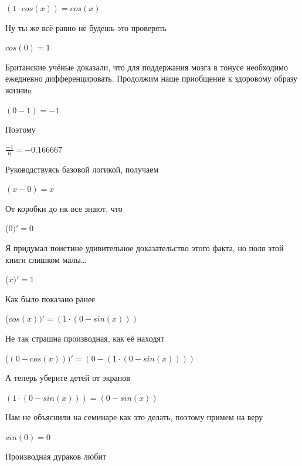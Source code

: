 \documentclass[12pt,a4paper,fleqn]{article}
\begin{document}
\begin{center}
\begin{center}
\begin{center}
\begin{center}
\begin{center}
\begin{center}
\begin{center}
$(1 \cdot cos(x)) = cos(x)$\end{center}
Ну ты же всё равно не будешь это проверять

\begin{center}
\begin{center}$cos(0) = 1$\end{center}
Британские учёные доказали, что для поддержания мозга в тонусе необходимо ежедневно дифференцировать. Продолжим наше приобщение к здоровому образу жизниn

\begin{center}
\begin{center}$(0-1) = -1$\end{center}
Поэтому

\begin{center}
\begin{center}$\frac{-1}{6} = -0.166667$\end{center}
Руководствуясь базовой логикой, получаем

\begin{center}
$(x-0) = x$\end{center}
От коробки до нк все знают, что

\begin{center}
 ($0)'
  = 0$\end{center}
Я придумал поистине удивительное доказательство этого факта, но поля этой книги слишком малы\ldots

\begin{center}
 ($x)'
  = 1$\end{center}
Как было показано ранее

\begin{center}
 ($cos(x))'
  = (1 \cdot (0-sin(x)))$\end{center}
Не так страшна производная, как её находят\cite{link2}

\begin{center}
 ($(0-cos(x)))'
  = (0-(1 \cdot (0-sin(x))))$\end{center}
А теперь уберите детей от экранов

\begin{center}
$(1 \cdot (0-sin(x))) = (0-sin(x))$\end{center}
Нам не объяснили на семинаре как это делать, поэтому примем на веру

\begin{center}
\begin{center}$sin(0) = 0$\end{center}
Производная дураков любит\cite{link2}


\end{center}
\end{center}
\end{center}
\end{center}
\end{center}
\end{center}
\end{center}
\end{center}
\end{center}
\end{center}
\end{document}
